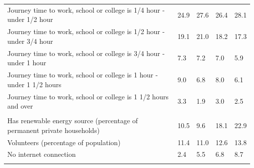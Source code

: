 \documentclass{article}
\begin{document}
\begin{table}[h]
\begin{tabular}{KTTTT}
Journey time to work, school or college is 1/4 hour - under 1/2 hour & 24.9& 27.6& 26.4& 28.1\\
Journey time to work, school or college is 1/2 hour - under 3/4 hour & 19.1& 21.0& 18.2& 17.3\\
Journey time to work, school or college is 3/4 hour - under 1 hour & 7.3& 7.2& 7.0& 5.9\\
Journey time to work, school or college is 1 hour - under 1 1/2 hours & 9.0& 6.8& 8.0& 6.1\\
Journey time to work, school or college is 1 1/2 hours and over & 3.3& 1.9& 3.0& 2.5\\
\hline
    \\ 
    \hline
Has renewable energy source (percentage of permanent private households) & 10.5&  9.6& 18.1& 22.9\\
    \hline
Volunteers (percentage of population) & 11.4& 11.0& 12.6& 13.8\\
    \hline
No internet connection& 2.4& 5.5& 6.8& 8.7\\
\hline
\end{tabular}
\end{table}
\end{document}
